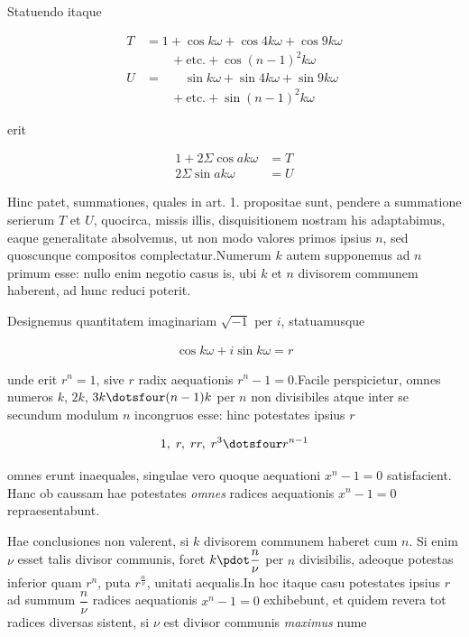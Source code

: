 Statuendo itaque

\[
\begin{aligned}
T&=1+\cos k\omega+\cos4k\omega+\cos9k\omega\\&\qquad+\text{etc.}+\cos(n-1)^2k\omega\\
U&=\phantom{1+}\sin k\omega+\sin4k\omega+\sin9k\omega\\&\qquad+\text{etc.}+\sin(n-1)^2k\omega
\end{aligned}
\]

erit

\[
\begin{aligned}
1+2\Sigma\cos ak\omega&=T\\
2\Sigma\sin ak\omega&=U
\end{aligned}
\]

Hinc patet, summationes, quales in art. 1. propositae sunt, pendere a summatione serierum $T$ et $U$, quocirca, missis illis, disquisitionem nostram his adaptabimus, eaque generalitate absolvemus, ut non modo valores primos ipsius $n$, sed quoscunque compositos complectatur.\quad Numerum $k$ autem supponemus ad $n$ primum esse: nullo enim negotio casus is, ubi $k$ et $n$ divisorem communem haberent, ad hunc reduci poterit.


Designemus quantitatem imaginariam $\surd{-1}$ per $i$, statuamusque

\[
\begin{aligned}
\cos k\omega+i\sin k\omega=r
\end{aligned}
\]

unde erit $r^n=1$, sive $r$ radix aequationis $r^n-1=0$.\quad Facile perspicietur, omnes numeros $k$, $2k$, $3k\dotsfour(n-1)k$ per $n$ non divisibiles atque inter se secundum modulum $n$ incongruos esse: hinc potestates ipsius $r$

\[
\begin{aligned}
1,\;r,\;rr,\;r^3\dotsfour r^{n-1}
\end{aligned}
\]

omnes erunt inaequales, singulae vero quoque aequationi $x^n-1=0$ satisfacient. Hanc ob caussam hae potestates \emph{omnes} radices aequationis $x^n-1=0$ repraesentabunt.

Hae conclusiones non valerent, si $k$ divisorem communem haberet cum $n$. Si enim $\nu$ esset talis divisor communis, foret $k\pdot\dfrac n\nu$ per $n$ divisibilis, adeoque potestas inferior quam $r^n$, puta $r^{\frac n\nu}$, unitati aequalis.\quad In hoc itaque casu potestates ipsius $r$ ad summum $\dfrac n\nu$ radices aequationis $x^n-1=0$ exhibebunt, et quidem revera tot radices diversas sistent, si $\nu$ est divisor communis \emph{maximus} nume

